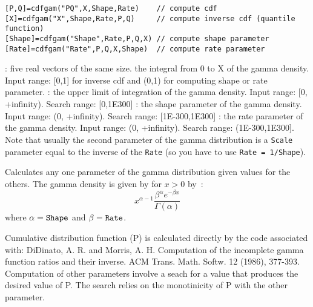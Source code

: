 \begin{mandesc}
\end{mandesc}
\label{cdfgam}
\begin{calling_sequence}
\begin{verbatim}
[P,Q]=cdfgam("PQ",X,Shape,Rate)    // compute cdf
[X]=cdfgam("X",Shape,Rate,P,Q)     // compute inverse cdf (quantile function)
[Shape]=cdfgam("Shape",Rate,P,Q,X) // compute shape parameter 
[Rate]=cdfgam("Rate",P,Q,X,Shape)  // compute rate parameter
\end{verbatim}
\end{calling_sequence}
\begin{parameters}
  \begin{varlist}
    : five real vectors of the same size.
     the integral from 0 to X of the gamma density. Input range: [0,1] for inverse cdf and
          (0,1) for computing shape or rate parameter.
    : the upper limit of integration of the gamma density. Input range: [0, +infinity). Search range: [0,1E300]
      :  the shape parameter of the gamma density. Input range: (0, +infinity). Search range: [1E-300,1E300]
      :  the rate parameter of the gamma density. Input range: (0, +infinity). Search range: (1E-300,1E300].
 Note that usually the second parameter of the gamma distribution is a \verb!Scale! parameter equal to the inverse of the \verb!Rate! 
  (so you have to use \verb!Rate = 1/Shape!).
  \end{varlist}
\end{parameters}
\begin{mandescription}
  Calculates any one parameter of the gamma distribution given values for the others.
  The gamma density is given by for $x>0$ by~:
  \begin{equation}
    x^{\alpha-1} \frac{ \beta^\alpha  e^{- \beta x}}{\Gamma(\alpha)}
  \end{equation}
  where $\alpha = \mbox{\tt Shape}$ and $\beta = \mbox{\tt Rate}$. 
 


  Cumulative distribution function (P) is calculated directly by
  the code associated with: DiDinato, A. R. and Morris, A. H. 
  Computation of the  incomplete
  gamma function  ratios  and their  inverse.   ACM  Trans.  Math.
  Softw. 12 (1986), 377-393.
  Computation of other parameters involve a seach for a value that
  produces  the desired  value  of P.   The search relies  on  the
  monotinicity of P with the other parameter.
\end{mandescription}

